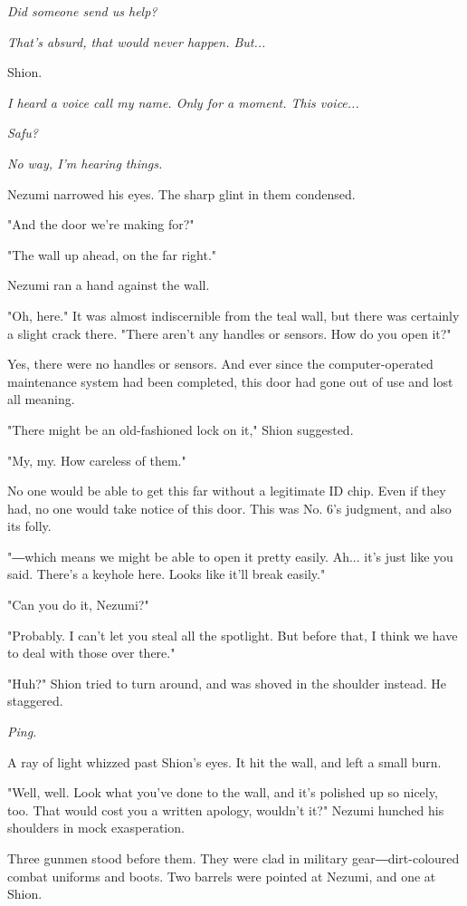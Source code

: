 \emph{Did someone send us help?}

\emph{That's absurd, that would never happen. But...}

Shion.

\emph{I heard a voice call my name. Only for a moment. This voice...}

\emph{Safu?}

\emph{No way, I'm hearing things.}

Nezumi narrowed his eyes. The sharp glint in them condensed.

"And the door we're making for?"

"The wall up ahead, on the far right."

Nezumi ran a hand against the wall.

"Oh, here." It was almost indiscernible from the teal wall, but there
was certainly a slight crack there. "There aren't any handles or
sensors. How do you open it?"

Yes, there were no handles or sensors. And ever since the
computer-operated maintenance system had been completed, this door had
gone out of use and lost all meaning.

"There might be an old-fashioned lock on it," Shion suggested.

"My, my. How careless of them."

No one would be able to get this far without a legitimate ID chip. Even
if they had, no one would take notice of this door. This was No. 6's
judgment, and also its folly.

"―which means we might be able to open it pretty easily. Ah... it's just
like you said. There's a keyhole here. Looks like it'll break easily."

"Can you do it, Nezumi?"

"Probably. I can't let you steal all the spotlight. But before that, I
think we have to deal with those over there."

"Huh?" Shion tried to turn around, and was shoved in the shoulder
instead. He staggered.

\emph{Ping.}

A ray of light whizzed past Shion's eyes. It hit the wall, and left a
small burn.

"Well, well. Look what you've done to the wall, and it's polished up so
nicely, too. That would cost you a written apology, wouldn't it?" Nezumi
hunched his shoulders in mock exasperation.

Three gunmen stood before them. They were clad in military
gear―dirt-coloured combat uniforms and boots. Two barrels were pointed
at Nezumi, and one at Shion.

